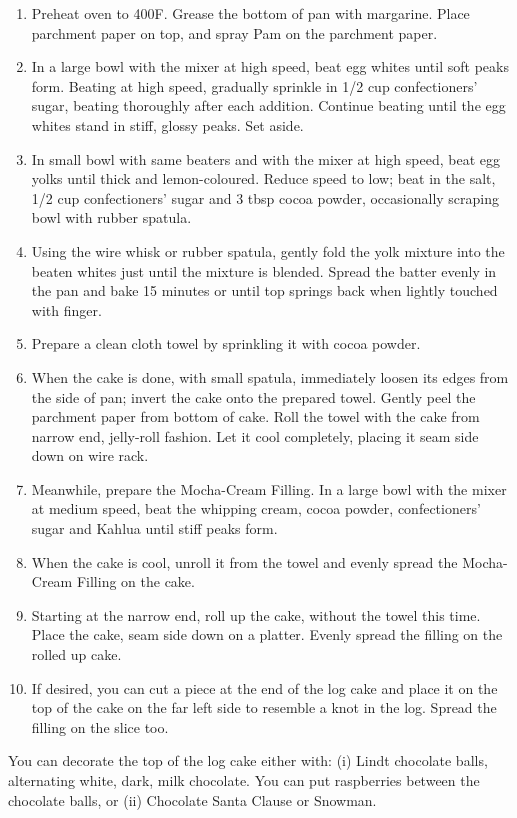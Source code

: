 \begin{enumerate}
    \item Preheat oven to 400\degree F. Grease the bottom of pan with margarine. Place parchment paper on top, and spray Pam on the parchment paper.
    \item In a large bowl with the mixer at high speed, beat egg whites until soft peaks form. Beating at high speed, gradually sprinkle in 1/2 cup confectioners' sugar, beating thoroughly after each addition. Continue beating until the egg whites stand in stiff, glossy peaks. Set aside.
    \item In small bowl with same beaters and with the mixer at high speed, beat egg yolks until thick and lemon-coloured. Reduce speed to low; beat in the salt, 1/2 cup confectioners' sugar and 3 tbsp cocoa powder, occasionally scraping bowl with rubber spatula.
    \item Using the wire whisk or rubber spatula, gently fold the yolk mixture into the beaten whites just until the mixture is blended. Spread the batter evenly in the pan and bake 15 minutes or until top springs back when lightly touched with finger.
    \item Prepare a clean cloth towel by sprinkling it with cocoa powder.
    \item When the cake is done, with small spatula, immediately loosen its edges from the side of pan; invert the cake onto the prepared towel. Gently peel the parchment paper from bottom of cake. Roll the towel with the cake from narrow end, jelly-roll fashion. Let it cool completely, placing it seam side down on wire rack.
    \item Meanwhile, prepare the Mocha-Cream Filling. In a large bowl with the mixer at medium speed, beat the whipping cream, cocoa powder, confectioners' sugar and Kahlua until stiff peaks form.
    \item When the cake is cool, unroll it from the towel and evenly spread the Mocha-Cream Filling on the cake.
    \item Starting at the narrow end, roll up the cake, without the towel this time. Place the cake, seam side down on a platter. Evenly spread the filling on the rolled up cake.
    \item If desired, you can cut a piece at the end of the log cake and place it on the top of the cake on the far left side to resemble a knot in the log. Spread the filling on the slice too.
\end{enumerate}

You can decorate the top of the log cake either with: (i) Lindt chocolate balls, alternating white, dark, milk chocolate. You can put raspberries between the chocolate balls, or (ii) Chocolate Santa Clause or Snowman.

